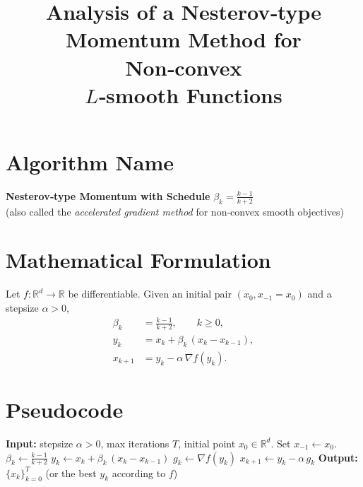 \documentclass{article}
\title{Analysis of a Nesterov‑type Momentum Method for Non‑convex \\ $L$‑smooth Functions}
\author{}
\date{}
\newcommand{\grad}{\nabla}
\begin{document}
\maketitle

\section*{Algorithm Name}
\textbf{Nesterov‑type Momentum with Schedule }$\displaystyle\beta_k=\frac{k-1}{k+2}$\\
(also called the \emph{accelerated gradient method} for non‑convex smooth objectives)

\section*{Mathematical Formulation}
Let $f:\mathbb{R}^d\rightarrow\mathbb{R}$ be differentiable.  
Given an initial pair $(x_{0},x_{-1}=x_{0})$ and a stepsize $\alpha>0$,
\[
\boxed{
\begin{aligned}
\beta_k &= \frac{k-1}{k+2},\qquad k\ge 0,\\[2mm]
y_k    &= x_k+\beta_k\,(x_k-x_{k-1}),\\[2mm]
x_{k+1}&= y_k-\alpha\,\grad f(y_k).
\end{aligned}}
\tag{1}
\]

\section*{Pseudocode}
\begin{algorithm}[H]
\caption{Nesterov‑type Momentum (β‑schedule $\frac{k-1}{k+2}$)}
\begin{algorithmic}[1]
\STATE \textbf{Input:} stepsize $\alpha>0$, max iterations $T$,
\STATE \hspace{1.2cm}initial point $x_0\in\mathbb{R}^d$.
\STATE Set $x_{-1}\gets x_0$.
    \STATE $\displaystyle \beta_k\gets\frac{k-1}{k+2}$ 
    \STATE $y_k\gets x_k+\beta_k\,(x_k-x_{k-1})$ 
    \STATE $g_k\gets \grad f(y_k)$ 
    \STATE $x_{k+1}\gets y_k-\alpha\,g_k$ 
\ENDFOR
\STATE \textbf{Output:} $\{x_k\}_{k=0}^T$ (or the best $y_k$ according to $f$)
\end{algorithmic}
\end{algorithm}
\end{document}
